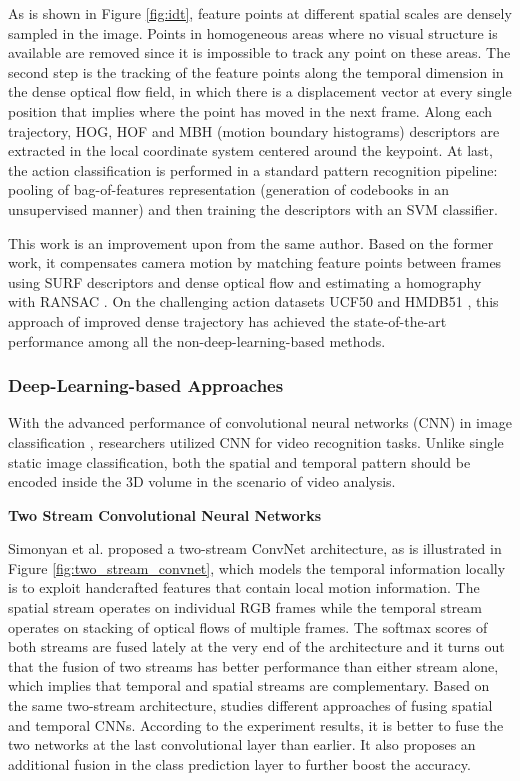 As is shown in Figure \ref{fig:idt}, feature points at different spatial scales are densely sampled in the image. Points in homogeneous areas where no visual structure is available are removed since it is impossible to track any point on these areas. The second step is the tracking of the feature points along the temporal dimension in the dense optical flow field, in which there is a displacement vector at every single position that implies where the point has moved in the next frame. Along each trajectory, HOG, HOF and MBH (motion boundary histograms) \cite{dala2006} descriptors are extracted in the local coordinate system centered around the keypoint. At last, the action classification is performed in a standard pattern recognition pipeline: pooling of bag-of-features representation (generation of codebooks in an unsupervised manner) and then training the descriptors with an SVM classifier.

This work is an improvement upon \cite{wang2011} from the same author. Based on the former work, it compensates camera motion by matching feature points between frames using SURF descriptors and dense optical flow and estimating a homography with RANSAC \cite{Fischler1981}. On the challenging action datasets UCF50 \cite{Reddy2013} and HMDB51 \cite{kuehne2011}, this approach of improved dense trajectory \cite{wang2013} has achieved the state-of-the-art performance among all the non-deep-learning-based methods. 


\subsubsection{Deep-Learning-based Approaches}
With the advanced performance of convolutional neural networks (CNN) in image classification \cite{DBLP:journals/corr/SimonyanZ14a}, researchers utilized CNN for video recognition tasks. Unlike single static image classification, both the spatial and temporal pattern should be encoded inside the 3D volume in the scenario of video analysis. 

\textbf{Two Stream Convolutional Neural Networks} 

Simonyan et al. \cite{DBLP:journals/corr/SimonyanZ14} proposed a two-stream ConvNet architecture, as is illustrated in Figure \ref{fig:two_stream_convnet}, which models the temporal information locally is to exploit handcrafted features that contain local motion information. The spatial stream operates on individual RGB frames while the temporal stream operates on stacking of optical flows of multiple frames. The softmax scores of both streams are fused lately at the very end of the architecture and it turns out that the fusion of two streams has better performance than either stream alone, which implies that temporal and spatial streams are complementary. Based on the same two-stream architecture, \cite{DBLP:journals/corr/FeichtenhoferPZ16} studies different approaches of fusing spatial and temporal CNNs. According to the experiment results, it is better to fuse the two networks at the last convolutional layer than earlier. It also proposes an additional fusion in the class prediction layer to further boost the accuracy. \\

